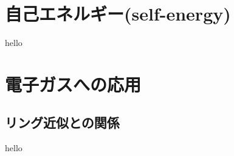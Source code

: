 \documentclass[dvipdfmx,11pt]{beamer}
\begin{document}
\section{自己エネルギー(self-energy)}
\begin{frame}
    hello
\end{frame}

\section{電子ガスへの応用}
\subsection{リング近似との関係}
\begin{frame}
    hello
\end{frame}
\end{document}
